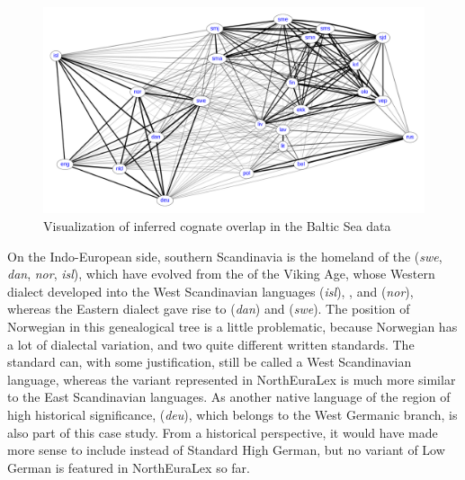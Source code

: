 \begin{figure}
 \includegraphics[width=\textwidth]{figures/cognacy-strength-baltic.pdf}
 \caption{Visualization of inferred cognate overlap in the Baltic Sea data}
 \label{baltic-cognacy}
\end{figure}

On the Indo-European side, southern Scandinavia is the homeland of the  (\textit{swe}, \textit{dan}, \textit{nor}, \textit{isl}), which have evolved from the  of the Viking Age, whose Western dialect developed into the West Scandinavian languages  (\textit{isl}), , and  (\textit{nor}), whereas the Eastern dialect gave rise to  (\textit{dan}) and  (\textit{swe}). The position of Norwegian in this genealogical tree is a little problematic, because Norwegian has a lot of dialectal variation, and two quite different written standards. The  standard can, with some justification, still be called a West Scandinavian language, whereas the  variant represented in NorthEuraLex is much more similar to the East Scandinavian languages. As another native language of the region of high historical significance,  (\textit{deu}), which belongs to the West Germanic branch, is 
also part of this case study. From a historical perspective, it would have made more sense to include  instead of Standard High German, but no variant of Low German is featured in NorthEuraLex so far.

